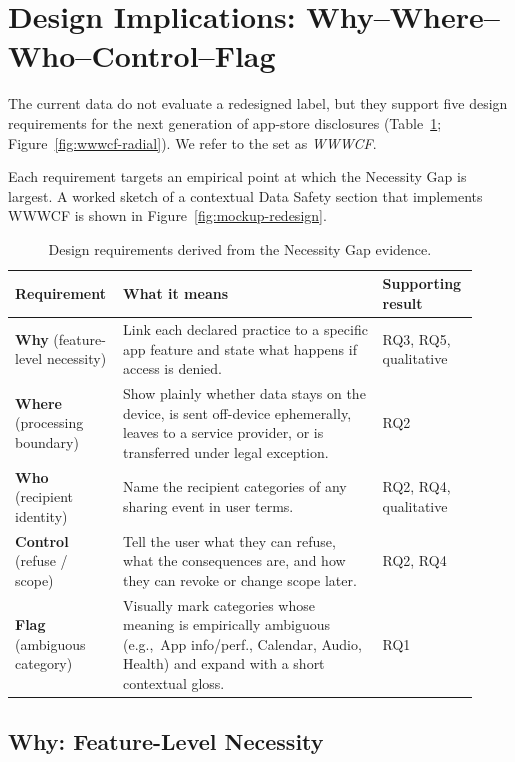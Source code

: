 \documentclass[11pt,a4paper]{article}
\makeatletter
\let\@oldsection\section
\renewcommand{\section}{\FloatBarrier\@oldsection}
\makeatother
\begin{document}
\section{Design Implications: Why--Where--Who--Control--Flag}
\label{sec:design}

The current data do not evaluate a redesigned label, but they support
five design requirements for the next generation of app-store
disclosures (Table~\ref{tab:design-implications};
Figure~\ref{fig:wwwcf-radial}). We refer to the set as \emph{WWWCF}.


Each requirement targets an empirical point at which the Necessity
Gap is largest. A worked sketch of a contextual Data Safety section
that implements WWWCF is shown in Figure~\ref{fig:mockup-redesign}.

\begin{table}[t]
\centering
\caption{Design requirements derived from the Necessity Gap evidence.}
\label{tab:design-implications}
\small
\begin{tabular}{p{0.18\linewidth}p{0.54\linewidth}p{0.20\linewidth}}
\toprule
\textbf{Requirement} & \textbf{What it means} & \textbf{Supporting result} \\
\midrule
\textbf{Why} (feature-level necessity) & Link each declared practice to a
specific app feature and state what happens if access is denied. & RQ3,
RQ5, qualitative \\
\textbf{Where} (processing boundary) & Show plainly whether data stays on
the device, is sent off-device ephemerally, leaves to a service provider,
or is transferred under legal exception. & RQ2 \\
\textbf{Who} (recipient identity) & Name the recipient categories of any
sharing event in user terms. & RQ2, RQ4, qualitative \\
\textbf{Control} (refuse / scope) & Tell the user what they can refuse,
what the consequences are, and how they can revoke or change scope
later. & RQ2, RQ4 \\
\textbf{Flag} (ambiguous category) & Visually mark categories whose
meaning is empirically ambiguous (e.g.,\ App info/perf., Calendar, Audio,
Health) and expand with a short contextual gloss. & RQ1 \\
\bottomrule
\end{tabular}
\end{table}

\subsection{Why: Feature-Level Necessity}
\label{subsec:design-why}
\end{document}

